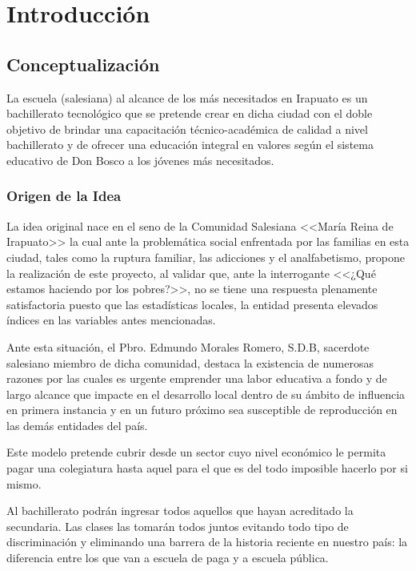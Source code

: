 \chapter{Introducción}

\section{Conceptualización}

La escuela (salesiana) al alcance de los más necesitados en Irapuato es un bachillerato tecnológico que se pretende crear en dicha ciudad con el doble objetivo de brindar una capacitación técnico-académica de calidad a nivel bachillerato y de ofrecer una educación integral en valores según el sistema educativo de Don Bosco a los jóvenes más necesitados.

\subsection{Origen de la Idea}

La idea original nace en el seno de la Comunidad Salesiana <<María Reina de Irapuato>> la cual ante la problemática social enfrentada por las familias en esta ciudad, tales como  la ruptura familiar, las adicciones y el analfabetismo, propone la realización de este proyecto, al validar que, ante la interrogante <<¿Qué estamos haciendo por los pobres?>>, no se tiene una respuesta plenamente satisfactoria puesto que las estadísticas locales, la entidad presenta elevados índices en las variables antes mencionadas.\citep{Morales09}

Ante esta situación, el Pbro. Edmundo Morales Romero, S.D.B, sacerdote salesiano miembro de dicha comunidad, destaca la existencia de numerosas razones por las cuales es urgente emprender una labor educativa a fondo y de largo alcance que impacte en el desarrollo local dentro de su ámbito de influencia en primera instancia y en un futuro próximo sea susceptible de reproducción en las demás entidades del país.

Este modelo pretende cubrir desde un sector cuyo nivel económico le permita pagar una colegiatura hasta aquel para el que es del todo imposible hacerlo por si mismo.

Al bachillerato podrán ingresar todos aquellos que hayan acreditado la secundaria. Las clases las tomarán todos juntos evitando todo tipo de discriminación y eliminando una barrera de la historia reciente en nuestro país: la diferencia entre los que van a escuela de paga y a escuela pública.

